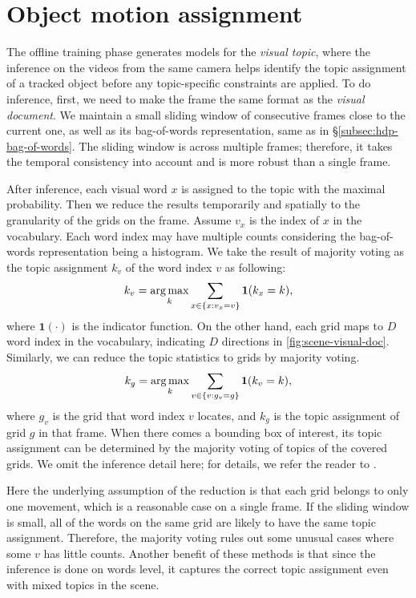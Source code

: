 \section{Object motion assignment}
\label{sec:semantic-inf}

The offline training phase generates models for the \emph{visual topic}, where the inference on the videos from the same camera helps identify the topic assignment of a tracked object before any topic-specific constraints are applied.
To do inference, first, we need to make the frame the same format as the \emph{visual document}.
We maintain a small sliding window of consecutive frames close to the current one, as well as its bag-of-words representation, same as in \S\ref{subsec:hdp-bag-of-words}.  
The sliding window is across multiple frames; therefore, it takes the temporal consistency into account and is more robust than a single frame.

After inference, each visual word $x$ is assigned to the topic with the maximal probability. 
Then we reduce the results temporarily and spatially to the granularity of the grids on the frame.
Assume $v_{x}$ is the index of $x$ in the vocabulary. 
Each word index may have multiple counts considering the bag-of-words representation being a histogram.
We take the result of majority voting as the topic assignment $k_v$ of the word index $v$ as following:
\begin{align}
k_{v} = \operatorname*{arg\,max}_k{\sum_{x\in\{x:v_{x} = v\}}{\mathbf{1}(k_{x} = k)}},
\end{align}
where $\mathbf{1}(\cdot)$ is the indicator function.
On the other hand, each grid maps to $D$ word index in the vocabulary, indicating $D$ directions in \ref{fig:scene-visual-doc}.
Similarly, we can reduce the topic statistics to grids by majority voting.
\begin{align}
k_{g} = \operatorname*{arg\,max}_k{\sum_{v\in\{v:g_{v} = g\}}{\mathbf{1}(k_v = k)}},
\end{align}
where $g_{v}$ is the grid that word index $v$ locates, and $k_g$ is the topic assignment of grid $g$ in that frame.
When there comes a bounding box of interest, its topic assignment can be determined by the majority voting of topics of the covered grids.
We omit the inference detail here; for details, we refer the reader to \cite{yee2006hierarchical}.

Here the underlying assumption of the reduction is that each grid belongs to only one movement, which is a reasonable case on a single frame.
If the sliding window is small, all of the words on the same grid are likely to have the same topic assignment.
Therefore, the majority voting rules out some unusual cases where some $v$ has little counts.
Another benefit of these methods is that since the inference is done on words level, it captures the correct topic assignment even with mixed topics in the scene.